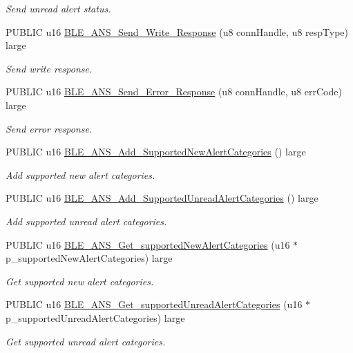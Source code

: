 \begin{DoxyCompactItemize}
\begin{DoxyCompactList}\small\item\em Send unread alert status. \end{DoxyCompactList}\item 
P\+U\+B\+L\+IC u16 \hyperlink{group___b_l_e___a_n_s_ga7e33cddd51ead14091de734720ce2478}{B\+L\+E\+\_\+\+A\+N\+S\+\_\+\+Send\+\_\+\+Write\+\_\+\+Response} (u8 conn\+Handle, u8 resp\+Type) large
\begin{DoxyCompactList}\small\item\em Send write response. \end{DoxyCompactList}\item 
P\+U\+B\+L\+IC u16 \hyperlink{group___b_l_e___a_n_s_gaad46fa2ee9dcec78ecd36415fdc5bcdb}{B\+L\+E\+\_\+\+A\+N\+S\+\_\+\+Send\+\_\+\+Error\+\_\+\+Response} (u8 conn\+Handle, u8 err\+Code) large
\begin{DoxyCompactList}\small\item\em Send error response. \end{DoxyCompactList}\item 
P\+U\+B\+L\+IC u16 \hyperlink{group___b_l_e___a_n_s_gad19a07f6e6c2f3d1b2014caff90d2d5a}{B\+L\+E\+\_\+\+A\+N\+S\+\_\+\+Add\+\_\+\+Supported\+New\+Alert\+Categories} () large
\begin{DoxyCompactList}\small\item\em Add supported new alert categories. \end{DoxyCompactList}\item 
P\+U\+B\+L\+IC u16 \hyperlink{group___b_l_e___a_n_s_ga0058ffa32f5318301490f78c4d5d581f}{B\+L\+E\+\_\+\+A\+N\+S\+\_\+\+Add\+\_\+\+Supported\+Unread\+Alert\+Categories} () large
\begin{DoxyCompactList}\small\item\em Add supported unread alert categories. \end{DoxyCompactList}\item 
P\+U\+B\+L\+IC u16 \hyperlink{group___b_l_e___a_n_s_gaeb367e2ef7c21652b9d7c64dc4b21521}{B\+L\+E\+\_\+\+A\+N\+S\+\_\+\+Get\+\_\+supported\+New\+Alert\+Categories} (u16 $\ast$p\+\_\+supported\+New\+Alert\+Categories) large
\begin{DoxyCompactList}\small\item\em Get supported new alert categories. \end{DoxyCompactList}\item 
P\+U\+B\+L\+IC u16 \hyperlink{group___b_l_e___a_n_s_ga155e3f54a1cfbffa0d88c73399210ae3}{B\+L\+E\+\_\+\+A\+N\+S\+\_\+\+Get\+\_\+supported\+Unread\+Alert\+Categories} (u16 $\ast$p\+\_\+supported\+Unread\+Alert\+Categories) large
\begin{DoxyCompactList}\small\item\em Get supported unread alert categories. \end{DoxyCompactList}\end{DoxyCompactItemize}
